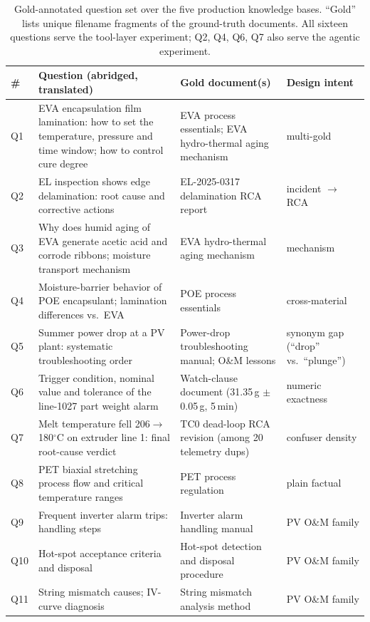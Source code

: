 \documentclass[preprint,12pt]{elsarticle}
\begin{document}
\begin{table}[!htbp]
\centering
\scriptsize
\setlength{\tabcolsep}{3pt}
\caption{Gold-annotated question set over the five production knowledge
bases. ``Gold'' lists unique filename fragments of the ground-truth
documents. All sixteen questions serve the tool-layer experiment; Q2, Q4, Q6, Q7 also
serve the agentic experiment.}
\label{tab:questions}
\begin{tabular}{lp{5.3cm}p{4.0cm}p{2.8cm}}
\toprule
\# & Question (abridged, translated) & Gold document(s) & Design intent \\
\midrule
Q1 & EVA encapsulation film lamination: how to set the temperature, pressure
and time window; how to control cure degree & EVA process essentials; EVA
hydro-thermal aging mechanism & multi-gold \\
Q2 & EL inspection shows edge delamination: root cause and corrective
actions & EL-2025-0317 delamination RCA report & incident $\to$ RCA \\
Q3 & Why does humid aging of EVA generate acetic acid and corrode ribbons;
moisture transport mechanism & EVA hydro-thermal aging mechanism & mechanism \\
Q4 & Moisture-barrier behavior of POE encapsulant; lamination differences
vs.\ EVA & POE process essentials & cross-material \\
Q5 & Summer power drop at a PV plant: systematic troubleshooting order &
Power-drop troubleshooting manual; O\&M lessons & synonym gap
(``drop'' vs.\ ``plunge'') \\
Q6 & Trigger condition, nominal value and tolerance of the line-1027 part
weight alarm & Watch-clause document (31.35\,g $\pm$0.05\,g, 5\,min) &
numeric exactness \\
Q7 & Melt temperature fell 206$\to$180$^\circ$C on extruder line 1: final
root-cause verdict & TC0 dead-loop RCA revision (among 20 telemetry dups) &
confuser density \\
Q8 & PET biaxial stretching process flow and critical temperature ranges &
PET process regulation & plain factual \\
Q9 & Frequent inverter alarm trips: handling steps & Inverter alarm handling
manual & PV O\&M family \\
Q10 & Hot-spot acceptance criteria and disposal & Hot-spot detection and
disposal procedure & PV O\&M family \\
Q11 & String mismatch causes; IV-curve diagnosis & String mismatch analysis
method & PV O\&M family \\

\end{tabular}
\end{table}
\end{document}
